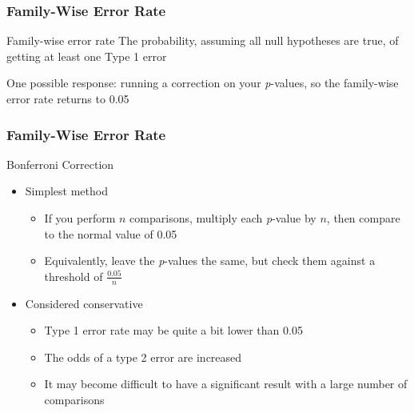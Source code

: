 \documentclass[10pt, block=fill]{beamer}
\begin{document}
\begin{frame}
  \frametitle{Family-Wise Error Rate}

  \begin{block}{Family-wise error rate}
    The probability, assuming all null hypotheses are true, of getting at least one Type 1 error
  \end{block}
  
  One possible response: running a correction on your \textit{p}-values, so the family-wise error rate returns to 0.05
\end{frame}

\begin{frame}
  \frametitle{Family-Wise Error Rate}
    
  \begin{block}{Bonferroni Correction}
    \begin{itemize}
      \item Simplest method
      \begin{itemize}
        \item If you perform $n$ comparisons, multiply each \textit{p}-value by $n$, then compare to the normal value of 0.05
        \item Equivalently, leave the \textit{p}-values the same, but check them against a threshold of $\frac{0.05}{n}$
      \end{itemize}
      \item Considered conservative
      \begin{itemize}
        \item Type 1 error rate may be quite a bit lower than 0.05
        \item The odds of a type 2 error are increased
        \item It may become difficult to have a significant result with a large number of comparisons
      \end{itemize}
    \end{itemize}
  \end{block}
  
\end{frame}
\end{document}
